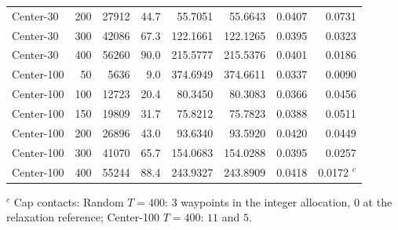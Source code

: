 \begin{table}[!tbp]
\begin{tabular}{lrrrrrrr}
Center-30 & 200 & 27912 & 44.7 & 55.7051 & 55.6643 & 0.0407 & 0.0731\\
Center-30 & 300 & 42086 & 67.3 & 122.1661 & 122.1265 & 0.0395 & 0.0323\\
Center-30 & 400 & 56260 & 90.0 & 215.5777 & 215.5376 & 0.0401 & 0.0186\\
\addlinespace[2pt]
Center-100 & 50 & 5636 & 9.0 & 374.6949 & 374.6611 & 0.0337 & 0.0090\\
Center-100 & 100 & 12723 & 20.4 & 80.3450 & 80.3083 & 0.0366 & 0.0456\\
Center-100 & 150 & 19809 & 31.7 & 75.8212 & 75.7823 & 0.0388 & 0.0511\\
Center-100 & 200 & 26896 & 43.0 & 93.6340 & 93.5920 & 0.0420 & 0.0449\\
Center-100 & 300 & 41070 & 65.7 & 154.0683 & 154.0288 & 0.0395 & 0.0257\\
Center-100 & 400 & 55244 & 88.4 & 243.9327 & 243.8909 & 0.0418 & 0.0172 $^{c}$\\
\bottomrule
\end{tabular}

\smallskip\footnotesize $^{c}$ Cap contacts: Random $T=400$: $3$ waypoints in the integer allocation, $0$ at the relaxation reference; Center-100 $T=400$: $11$ and $5$.
\end{table}
